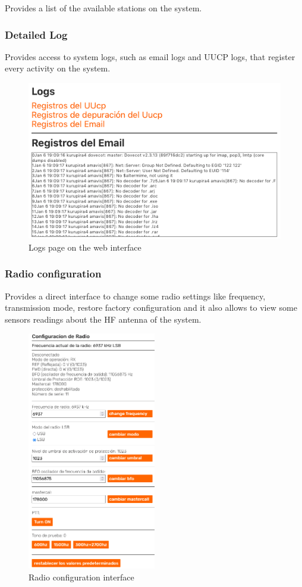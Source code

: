 \documentclass[11pt,a4paper]{article}
\begin{document}
Provides a list of the available stations on the system.
    
\subsubsection{Detailed Log}
Provides access to system logs, such as email logs and UUCP logs, that register every activity on the system.
    
    \begin{figure}[H]
    \centering
    \includegraphics[width=0.5\columnwidth]{screenshots/frontend/es_old/emaillog.png}
    \caption{Logs page on the web interface}
    \label{fig:logs}
\end{figure}

\subsubsection{Radio configuration}

Provides a direct interface to  change some radio settings like frequency, transmission mode, restore factory configuration and it also allows to view some sensors readings about the HF antenna of the system. 

\begin{figure}[H]
    \centering
    \includegraphics[width=0.5\textwidth]{screenshots/frontend/es/radioconfig.png}
    \caption{Radio configuration interface}
	\vspace{-10pt}
    \label{fig:radioconf}
\end{figure}
\end{document}
